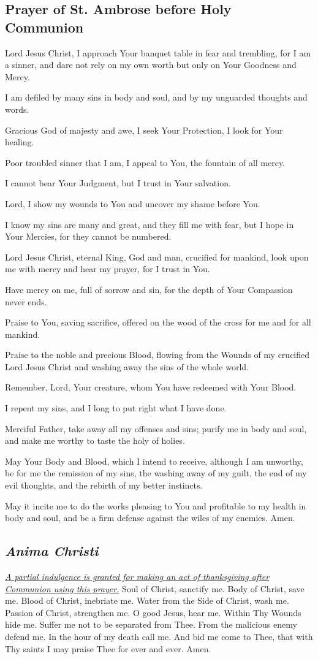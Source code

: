\documentclass[12pt]{article}
\newcommand{\prayertitle}[1]{\subsection{#1}}
\newcommand{\indulgencedprayertitle}[1]{\prayertitle{#1 \protect\kreuz}}
\newcommand{\emphasis}[1]{\emph{#1}}
\newcommand{\emphasis}[1]{\textsl{#1}}
\newcommand{\foreign}[1]{\emphasis{#1}}
\newcommand{\note}[1]{{\small{\emphasis{#1}}}\newline}
\newcommand{\linkednote}[2]{\hyperlink{#1}{\note{#2}}}
\begin{document}
\prayertitle{Prayer of St. Ambrose before Holy Communion}
Lord Jesus Christ, I approach Your banquet table in fear and trembling, for I am a sinner, and dare not rely on my own worth but only on Your Goodness and Mercy.

I am defiled by many sins in body and soul, and by my unguarded thoughts and words.

Gracious God of majesty and awe, I seek Your Protection, I look for Your healing.

Poor troubled sinner that I am, I appeal to You, the fountain of all mercy.

I cannot bear Your Judgment, but I trust in Your salvation.

Lord, I show my wounds to You and uncover my shame before You.

I know my sins are many and great, and they fill me with fear, but I hope in Your Mercies, for they cannot be numbered.

Lord Jesus Christ, eternal King, God and man, crucified for mankind, look upon me with mercy and hear my prayer, for I trust in You.

Have mercy on me, full of sorrow and sin, for the depth of Your Compassion never ends.

Praise to You, saving sacrifice, offered on the wood of the cross for me and for all mankind.

Praise to the noble and precious Blood, flowing from the Wounds of my crucified Lord Jesus Christ and washing away the sins of the whole world.

Remember, Lord, Your creature, whom You have redeemed with Your Blood.

I repent my sins, and I long to put right what I have done.

Merciful Father, take away all my offenses and sins;
purify me in body and soul, and make me worthy to taste the holy of holies.

May Your Body and Blood, which I intend to receive, although I am unworthy, be for me the remission of my sins, the washing away of my guilt, the end of my evil thoughts, and the rebirth of my better instincts.

May it incite me to do the works pleasing to You and profitable to my health in body and soul, and be a firm defense against the wiles of my enemies.
Amen.
\newpage
\indulgencedprayertitle{\foreign{Anima Christi}}
\linkednote{grant8}{A partial indulgence is granted for making an act of thanksgiving after Communion using this prayer.}
Soul of Christ, sanctify me.
Body of Christ, save me.
Blood of Christ, inebriate me.
Water from the Side of Christ, wash me.
Passion of Christ, strengthen me.
O good Jesus, hear me.
Within Thy Wounds hide me.
Suffer me not to be separated from Thee.
From the malicious enemy defend me.
In the hour of my death call me.
And bid me come to Thee,
that with Thy saints I may praise Thee for ever and ever.
Amen.
\end{document}
